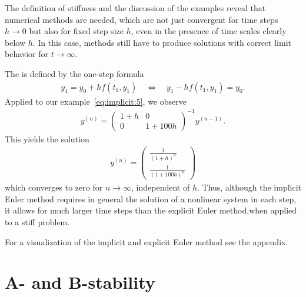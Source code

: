 \begin{remark}
  \label{remark:impl:1}
  The definition of stiffness and the discussion of the examples
  reveal that numerical methods are needed, which are not just
  convergent for time steps $h\to 0$ but also for fixed step size $h$,
  even in the presence of time scales clearly below $h$. In this case,
  methods still have to produce solutions with correct limit behavior
  for $t\to\infty$.
\end{remark}

\begin{example}
  The  is defined by the one-step
  formula
  \begin{gather}
    \label{eq:implicit:17}
    y_1 = y_0 + hf(t_1, y_1)
    \quad \Leftrightarrow \quad
    y_1 - h f(t_1, y_1) = y_0.
  \end{gather}
  Applied to our example~\eqref{eq:implicit:5}, we observe
  \begin{gather*}
    y^{(n)} =
    \begin{pmatrix}
      1 + h & 0 \\ 0 & 1+100h
    \end{pmatrix}^{-1}
    y^{(n-1)}.
  \end{gather*}
  This yields the solution
  \begin{gather*}
    y^{(n)} =
    \begin{pmatrix}
      \frac1{(1+h)^n} \\
      \frac1{(1+100h)^n}
    \end{pmatrix}
  \end{gather*}
  which converges to zero for $n\to \infty$, independent of $h$. Thus,
  although the implicit Euler method requires in general the solution
  of a nonlinear system in each step, it allows for much larger time
  steps than the explicit Euler method,when applied to a stiff problem.
  
  For a visualization of the implicit and explicit Euler method see the
  appendix.
\end{example}
\section{A- and B-stability}


